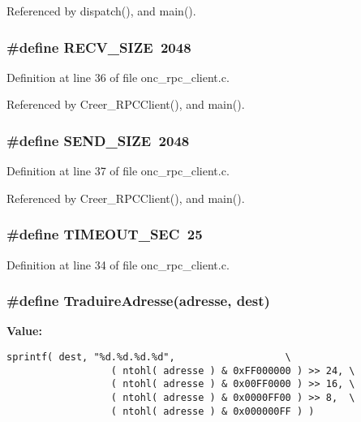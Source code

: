 Referenced by dispatch(), and main().
\subsubsection{\setlength{\rightskip}{0pt plus 5cm}\#define RECV\_\-SIZE\ 2048}\label{onc__rpc__client_8c_a3}




Definition at line 36 of file onc\_\-rpc\_\-client.c.

Referenced by Creer\_\-RPCClient(), and main().
\subsubsection{\setlength{\rightskip}{0pt plus 5cm}\#define SEND\_\-SIZE\ 2048}\label{onc__rpc__client_8c_a4}




Definition at line 37 of file onc\_\-rpc\_\-client.c.

Referenced by Creer\_\-RPCClient(), and main().
\subsubsection{\setlength{\rightskip}{0pt plus 5cm}\#define TIMEOUT\_\-SEC\ 25}\label{onc__rpc__client_8c_a1}




Definition at line 34 of file onc\_\-rpc\_\-client.c.
\subsubsection{\setlength{\rightskip}{0pt plus 5cm}\#define Traduire\-Adresse(adresse, dest)}\label{onc__rpc__client_8c_a0}


{\bf Value:}

\footnotesize\begin{verbatim}sprintf( dest, "%d.%d.%d.%d",                   \
                  ( ntohl( adresse ) & 0xFF000000 ) >> 24, \
                  ( ntohl( adresse ) & 0x00FF0000 ) >> 16, \
                  ( ntohl( adresse ) & 0x0000FF00 ) >> 8,  \
                  ( ntohl( adresse ) & 0x000000FF ) )
\end{verbatim}\normalsize 


